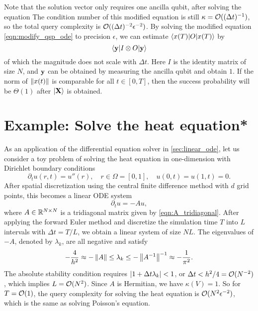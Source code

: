 Note that the solution vector only requires one ancilla qubit, after solving the equation
The condition number of this modified equation is still $\kappa=\mathcal{O}((\Delta t)^{-1})$, so the total query complexity is $\mathcal{O}((\Delta t)^{-2}\epsilon^{-2})$. 
By solving the modified equation \cref{eqn:modify_qsp_ode} to precision $\epsilon$, we can estimate $\braket{x(T)|O|x(T)}$ by
\begin{equation}
\braket{\mathbf{y}|I\otimes O|\mathbf{y}}
\end{equation}
of which the magnitude does not scale with $\Delta t$. 
Here $I$ is the identity matrix of size $N$, and $\mathbf{y}$ can be obtained by measuring the ancilla qubit and obtain $1$. 
If the norm of $\left\lVert x(t)\right\rVert$ is comparable for all $t\in[0,T]$, then the success probability will be $\Theta(1)$ after $\ket{\mathbf{X}}$ is obtained.



\section{Example: Solve the heat equation*}\label{sec:heatequation}

As an application of the differential equation solver in \ref{sec:linear_ode}, let us consider a toy problem of solving the heat equation in one-dimension with Dirichlet boundary conditions
\begin{equation}
\partial_t u(r,t)=u''(r), \quad r\in \Omega=[0,1], \quad u(0,t)=u(1,t)=0.
\end{equation}
After spatial discretization using the central finite difference method with $d$ grid points, this becomes a linear ODE system
\begin{equation}
\partial_t u=-Au,
\end{equation}
where $A\in \mathbb{R}^{N\times N}$ is a tridiagonal matrix given by \cref{eqn:A_tridiagonal}.
After applying the forward Euler method and discretize the simulation time $T$ into $L$ intervals with $\Delta t=T/L$, we obtain a linear system of size $NL$. The eigenvalues of $-A$, denoted by $\lambda_k$, are all negative and satisfy
\begin{equation}
-\frac{4}{h^2}\approx -\left\lVert A\right\rVert\le \lambda_k\le -\left\lVert A^{-1}\right\rVert^{-1}\approx -\frac{1}{\pi^2}.
\end{equation}The absolute stability condition requires $\left\lvert1+\Delta t \lambda_k\right\rvert<1$, or $\Delta t<h^2/4=\mathcal{O}(N^{-2})$, which implies $L=\mathcal{O}(N^2)$.   Since $A$ is Hermitian, we have $\kappa(V)=1$. 
So for $T=\mathcal{O}(1)$, the query complexity for solving the heat equation is $\mathcal{O}(N^2\epsilon^{-2})$, which is the same as solving Poisson's equation.


